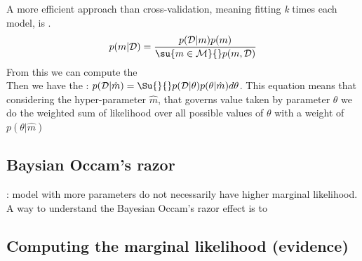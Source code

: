 A more efficient approach than cross-validation, meaning fitting \emph{k} times each
model, is .
$$
p(m|\mathcal{D}) = \dfrac{p(\mathcal{D}|m)p(m)}{\su{{m\in\mathcal{M}}}{}p(m,\mathcal{D})}
$$
From this we can compute the \\
Then we have the : $p(\mathcal{D}|\hat{m}) = \Su{}{}p(
\mathcal{D}|\theta)p(\theta|\hat{m})d\theta$. This equation means that considering the 
hyper-parameter $\hat{m}$, that governs value taken by parameter $\theta$ we do the weighted sum
of likelihood over all possible values of $\theta$ with a weight of $p(\theta|\hat{m})$

\subsection{Baysian Occam's razor}
: model with more parameters do not necessarily have higher 
marginal likelihood.\\
A way to understand the Bayesian Occam's razor effect is to 

\subsection{Computing the marginal likelihood (evidence)}
